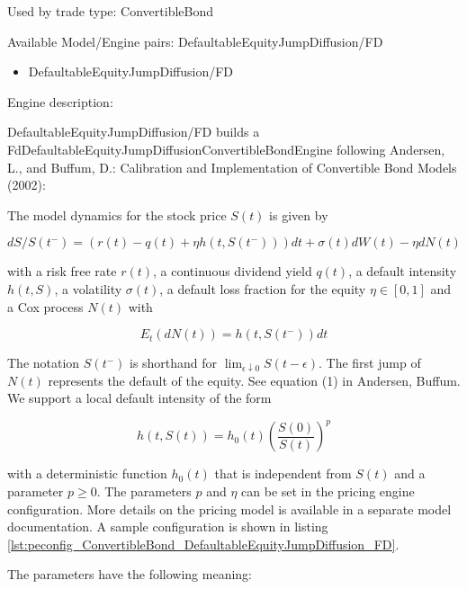 Used by trade type: ConvertibleBond

Available Model/Engine pairs: DefaultableEquityJumpDiffusion/FD

\begin{itemize}
\item DefaultableEquityJumpDiffusion/FD
\end{itemize}

Engine description:

DefaultableEquityJumpDiffusion/FD builds a FdDefaultableEquityJumpDiffusionConvertibleBondEngine following Andersen, L.,
and Buffum, D.: Calibration and Implementation of Convertible Bond Models (2002):

The model dynamics for the stock price $S(t)$ is given by

\begin{equation}
  dS / S(t^-) = (r(t) - q(t) + \eta h(t, S(t^-))) dt + \sigma(t) dW(t) - \eta dN(t)
\end{equation}

with a risk free rate $r(t)$, a continuous dividend yield $q(t)$, a default intensity $h(t,S)$, a volatility
$\sigma(t)$, a default loss fraction for the equity $\eta \in [0,1]$ and a Cox process $N(t)$ with

\begin{equation}
  E_t(dN(t)) = h(t,S(t^-)) dt
\end{equation}

The notation $S(t^-)$ is shorthand for $\lim_{\epsilon\downarrow 0} S(t-\epsilon)$. The first jump of $N(t)$ represents
the default of the equity. See equation (1) in Andersen, Buffum. We support a local default intensity of the form

\begin{equation}
h(t,S(t)) = h_0(t) \left( \frac{S(0)}{S(t)} \right)^p
\end{equation}

with a deterministic function $h_0(t)$ that is independent from $S(t)$ and a parameter $p \geq 0$. The parameters $p$
and $\eta$ can be set in the pricing engine configuration. More details on the pricing model is available in a separate
model documentation. A sample configuration is shown in listing
\ref{lst:peconfig_ConvertibleBond_DefaultableEquityJumpDiffusion_FD}.

The parameters have the following meaning:

